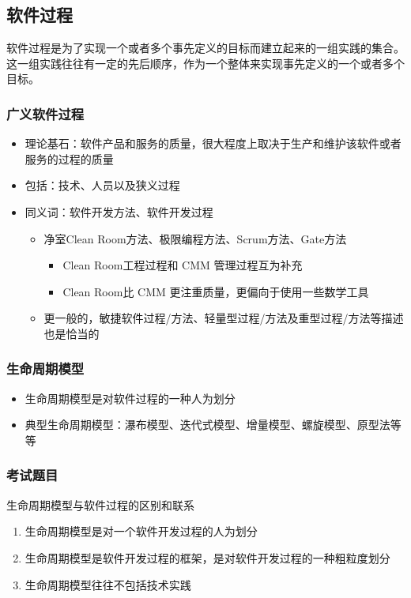 \subsection{软件过程}
软件过程是为了实现一个或者多个事先定义的目标而建立起来的一组实践的集合。这一组实践往往有一定的先后顺序，作为一个整体来实现事先定义的一个或者多个目标。

\subsubsection{广义软件过程}
\begin{itemize}
    \item 理论基石：软件产品和服务的质量，很大程度上取决于生产和维护该软件或者服务的过程的质量
    \item 包括：技术、人员以及狭义过程
    \item 同义词：软件开发方法、软件开发过程
    \begin{itemize}
        \item 净室Clean Room方法、极限编程方法、Scrum方法、Gate方法
        \begin{itemize}
            \item Clean Room工程过程和 CMM 管理过程互为补充
            \item Clean Room比 CMM 更注重质量，更偏向于使用一些数学工具
        \end{itemize}
        \item 更一般的，敏捷软件过程/方法、轻量型过程/方法及重型过程/方法等描述也是恰当的
    \end{itemize}
\end{itemize}

\subsubsection{生命周期模型}
\begin{itemize}
    \item 生命周期模型是对软件过程的一种人为划分
    \item 典型生命周期模型：瀑布模型、迭代式模型、增量模型、螺旋模型、原型法等等
\end{itemize}

\subsubsection{考试题目}
\begin{problem}
生命周期模型与软件过程的区别和联系
\begin{enumerate}[label=\arabic*.]
    \item 生命周期模型是对一个软件开发过程的人为划分
    \item 生命周期模型是软件开发过程的框架，是对软件开发过程的一种粗粒度划分
    \item 生命周期模型往往不包括技术实践
\end{enumerate}
\end{problem}

